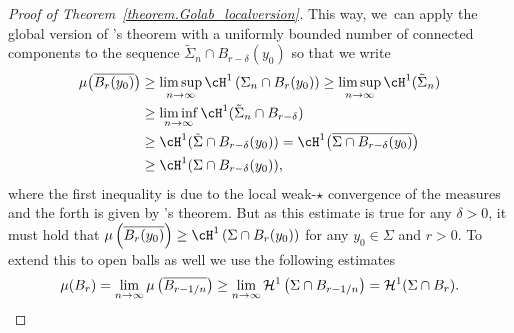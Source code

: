 \begin{proof}[Proof of Theorem~\ref{theorem.Golab_localversion}]
This way, we~can apply the global version of \Golab's theorem with a uniformly bounded number of connected components to the sequence $\tilde \Sigma_n \cap B_{r - \delta}(y_0)$ so that we write
\begin{align*}
\mu\bigl(\overline{B_r(y_0)}\bigr)
&\ge
\limsup_{n \to \infty} \cH^1\left(\Sigma_n \cap B_r(y_0)\right)
\ge
\limsup_{n \to \infty} \cH^1(\tilde \Sigma_n)\\
&\ge
\liminf_{n \to \infty} \cH^1(\tilde \Sigma_n\cap B_{r-\delta})\\
&\ge
\cH^1(\tilde \Sigma\cap B_{r-\delta}(y_0))
= \cH^1\bigl(\overline{\Sigma\cap B_{r-\delta}(y_0)}\bigr)\\
&\ge
\cH^1(\Sigma\cap B_{r-\delta}(y_0)),
\end{align*}
where the first inequality is due to the local weak-$\star$ convergence of the measures and the forth is given by \Golab's theorem. But as this estimate is true for any $\delta > 0$, it must hold that $\mu\left(\overline{B_r(y_0)}\right) \ge \cH^1\left(\Sigma\cap B_{r}(y_0)\right)$ for any $y_0 \in \Sigma$ and $r > 0$. To extend this to open balls as well we use the following estimates
\begin{equation*}
\mu(B_r)
=
\lim_{n \to \infty} \mu\left(\overline{B_{r - 1/n}}\right)
\ge
\lim_{n \to \infty} \mathcal{H}^1\left(\Sigma\cap B_{r - 1/n}\right)
= \mathcal{H}^1(\Sigma\cap B_r).\qedhere
\end{equation*}
\end{proof}

\pagebreak[2]
